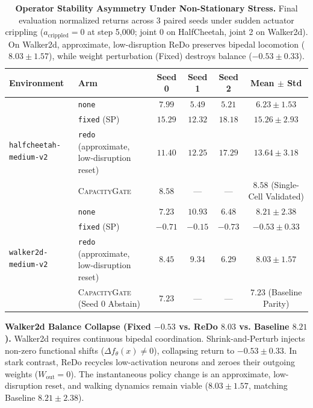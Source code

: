 \documentclass{article}
\begin{document}
\begin{table}[t]
\caption{\textbf{Operator Stability Asymmetry Under Non-Stationary Stress.} Final evaluation normalized returns across 3 paired seeds under sudden actuator crippling ($a_{\mathrm{crippled}} = 0$ at step 5,000; joint 0 on HalfCheetah, joint 2 on Walker2d). On Walker2d, approximate, low-disruption ReDo preserves bipedal locomotion ($8.03 \pm 1.57$), while weight perturbation (Fixed) destroys balance ($-0.53 \pm 0.33$).}
\label{tab:stress_results}
\centering
\small
\begin{tabular}{llcccc}
\toprule
\textbf{Environment} & \textbf{Arm} & \textbf{Seed 0} & \textbf{Seed 1} & \textbf{Seed 2} & \textbf{Mean $\pm$ Std} \\
\midrule
\multirow{4}{*}{\texttt{halfcheetah-medium-v2}} 
  & \texttt{none} & $7.99$ & $5.49$ & $5.21$ & $6.23 \pm 1.53$ \\
  & \texttt{fixed} (SP) & $15.29$ & $12.32$ & $18.18$ & $\mathbf{15.26} \pm \mathbf{2.93}$ \\
  & \texttt{redo} (approximate, low-disruption reset) & $11.40$ & $12.25$ & $17.29$ & $13.64 \pm 3.18$ \\
  & \textsc{CapacityGate} & $8.58$ & --- & --- & $8.58$ (Single-Cell Validated) \\
\midrule
\multirow{4}{*}{\texttt{walker2d-medium-v2}} 
  & \texttt{none} & $7.23$ & $10.93$ & $6.48$ & $8.21 \pm 2.38$ \\
  & \texttt{fixed} (SP) & $-0.71$ & $-0.15$ & $-0.73$ & $-0.53 \pm 0.33$ \\
  & \texttt{redo} (approximate, low-disruption reset) & $8.45$ & $9.34$ & $6.29$ & $\mathbf{8.03} \pm \mathbf{1.57}$ \\
  & \textsc{CapacityGate} (Seed 0 Abstain) & $7.23$ & --- & --- & $7.23$ (Baseline Parity) \\
\bottomrule
\end{tabular}
\end{table}

\textbf{Walker2d Balance Collapse (Fixed $-0.53$ vs. ReDo $8.03$ vs. Baseline $8.21$).} Walker2d requires continuous bipedal coordination. Shrink-and-Perturb injects non-zero functional shifts ($\Delta f_\theta(x) \neq 0$), collapsing return to $-0.53 \pm 0.33$. In stark contrast, ReDo recycles low-activation neurons and zeroes their outgoing weights ($W_{\mathrm{out}} = 0$). The instantaneous policy change is an approximate, low-disruption reset, and walking dynamics remain viable ($8.03 \pm 1.57$, matching Baseline $8.21 \pm 2.38$).
\end{document}
